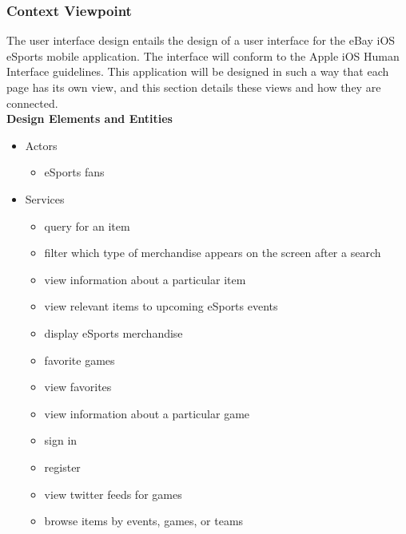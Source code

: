 \documentclass[onecolumn, draftclsnofoot,10pt, compsoc]{IEEEtran}
\begin{document}
\subsubsection{Context Viewpoint}
    The user interface design entails the design of a user interface for the eBay iOS eSports mobile application. The interface will conform to the Apple iOS Human Interface guidelines. This application will be designed in such a way that each page has its own view, and this section details these views and how they are connected.\\
     \indent\textbf{Design Elements and Entities}
     \begin{itemize}
     \item Actors
       \begin{itemize}
       \item eSports fans 
        \end{itemize}
       
     \item Services
      \begin{itemize}
      \item query for an item
      \item filter which type of merchandise appears on the screen after a search 
      \item view information about a particular item 
      \item view relevant items to upcoming eSports events
      \item display eSports merchandise
      \item favorite games
      \item view favorites
      \item view information about a particular game 
      \item sign in
      \item register 
      \item view twitter feeds for games
      \item browse items by events, games, or teams
       \end{itemize}
       \end{itemize}
       
\end{document}
